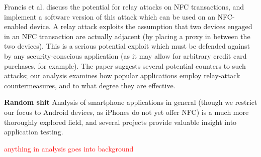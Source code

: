 \documentclass[12pt]{article}
\newcommand\TODO[1]{\textcolor{red}{#1}}
\begin{document}
Francis et al.\cite{francis2012} discuss the potential for relay attacks on NFC transactions, and implement a software version of this attack which can be used on an NFC-enabled device.
A relay attack exploits the assumption that two devices engaged in an NFC transaction are actually adjacent (by placing a proxy in between the two devices).
This is a serious potential exploit which must be defended against by any security-conscious application (as it may allow for arbitrary credit card purchases, for example).
The paper suggests several potential counters to such attacks; our analysis examines how popular applications employ relay-attack countermeasures, and to what degree they are effective.

\textbf{Random shit}
Analysis of smartphone applications in general (though we restrict our focus to Android devices, as iPhones do not yet offer NFC) is a much more thoroughly explored field, and several projects provide valuable insight into application testing.


\TODO{anything in analysis goes into background}
\end{document}
